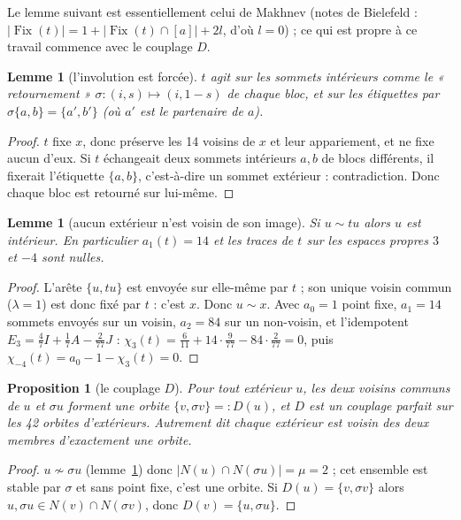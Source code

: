\documentclass[11pt,a4paper]{article}
\newtheorem{proposition}[theorem]{Proposition}
\newtheorem{lemma}[theorem]{Lemme}
\theoremstyle{definition}
\theoremstyle{remark}
\newcommand{\Fix}{\operatorname{Fix}}
\begin{document}
Le lemme suivant est essentiellement celui de Makhnev (notes de Bielefeld : $|\Fix(t)|=1+|\Fix(t)\cap[a]|+2l$, d'où $l=0$) ; ce qui est propre à ce travail commence avec le couplage $D$.
\begin{lemma}[l'involution est forcée]
$t$ agit sur les sommets intérieurs comme le « retournement » $\sigma:(i,s)\mapsto(i,1-s)$ de chaque bloc, et sur les étiquettes par $\sigma\{a,b\}=\{a',b'\}$
(où $a'$ est le partenaire de $a$).
\end{lemma}
\begin{proof}
$t$ fixe $x$, donc préserve les 14 voisins de $x$ et leur appariement, et ne fixe aucun d'eux. Si $t$ échangeait deux sommets intérieurs $a,b$ de blocs différents,
il fixerait l'étiquette $\{a,b\}$, c'est-à-dire un sommet extérieur : contradiction. Donc chaque bloc est retourné sur lui-même.
\end{proof}

\begin{lemma}[aucun extérieur n'est voisin de son image]\label{lem:noself}
Si $u\sim tu$ alors $u$ est intérieur. En particulier $a_1(t)=14$ et les traces de $t$ sur les espaces propres $3$ et $-4$ sont nulles.
\end{lemma}
\begin{proof}
L'arête $\{u,tu\}$ est envoyée sur elle-même par $t$ ; son unique voisin commun ($\lambda=1$) est donc fixé par $t$ : c'est $x$. Donc $u\sim x$.
Avec $a_0=1$ point fixe, $a_1=14$ sommets envoyés sur un voisin, $a_2=84$ sur un non-voisin, et l'idempotent $E_3=\tfrac47I+\tfrac17A-\tfrac2{77}J$ :
$\chi_3(t)=\tfrac6{11}+14\cdot\tfrac9{77}-84\cdot\tfrac2{77}=0$, puis $\chi_{-4}(t)=a_0-1-\chi_3(t)=0$.
\end{proof}

\begin{proposition}[le couplage $D$]
Pour tout extérieur $u$, les deux voisins communs de $u$ et $\sigma u$ forment une orbite $\{v,\sigma v\}=:D(u)$, et $D$ est un \emph{couplage parfait}
sur les 42 orbites d'extérieurs. Autrement dit chaque extérieur est voisin des deux membres d'exactement une orbite.
\end{proposition}
\begin{proof}
$u\not\sim\sigma u$ (lemme~\ref{lem:noself}) donc $|N(u)\cap N(\sigma u)|=\mu=2$ ; cet ensemble est stable par $\sigma$ et sans point fixe, c'est une orbite.
Si $D(u)=\{v,\sigma v\}$ alors $u,\sigma u\in N(v)\cap N(\sigma v)$, donc $D(v)=\{u,\sigma u\}$.
\end{proof}
\end{document}
